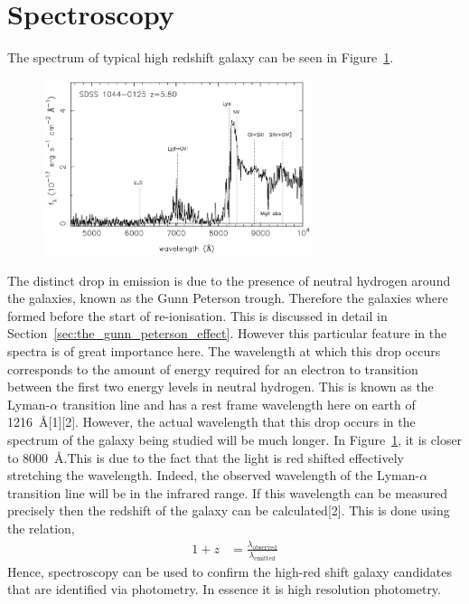 \section{Spectroscopy} %
\label{sec:spectroscopy}
	The spectrum of typical high redshift galaxy can be seen in Figure~\ref{fig:high_redshift_galaxy_spectrum}.
	\begin{figure}[!htbp]
		\centering
			\includegraphics[width=0.7\textwidth]{../Images/high_redshift_galaxy_spec.jpg}
		\caption{\label{fig:high_redshift_galaxy_spectrum}}
	\end{figure}

	The distinct drop in emission is due to the presence of neutral hydrogen around the galaxies, known as the Gunn Peterson trough. Therefore the galaxies where formed before the start of re-ionisation. This is discussed in detail in Section~\ref{sec:the_gunn_peterson_effect}. However this particular feature in the spectra is of great importance here. The wavelength at which this drop occurs corresponds to the amount of energy required for an electron to transition between the first two energy levels in neutral hydrogen. This is known as the Lyman-$\alpha$ transition line and has a rest frame wavelength here on earth of \SI{1216}{\angstrom}\cite{}[1][2]. However, the actual wavelength that this drop occurs in the spectrum of the galaxy being studied will be much longer. In Figure~\ref{fig:high_redshift_galaxy_spectrum}, it is closer to \SI{8000}{\angstrom}.This is due to the fact that the light is red shifted effectively stretching the wavelength. Indeed, the observed wavelength of the Lyman-$\alpha$ transition line will be in the infrared range. If this wavelength can be measured precisely then the redshift of the galaxy can be calculated\cite{}[2]. This is done using the relation,
	\begin{align}
		1+z &= \frac{\lambda_{\text{observed}}}{\lambda_{\text{emitted}}} \label{eq:spectroscopy}
	\end{align}
	Hence, spectroscopy can be used to confirm the high-red shift galaxy candidates that are identified via photometry. In essence it is high resolution photometry.

